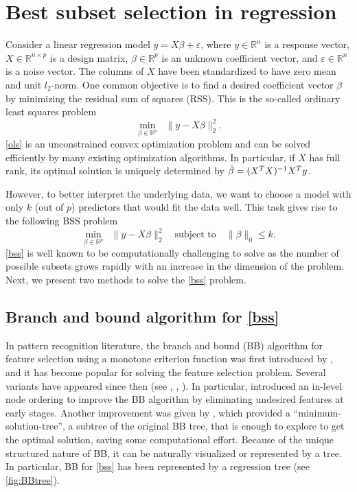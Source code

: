 \documentclass[10pt, letterpaper]{article}
\begin{document}
\section{Best subset selection in regression}\label{sec:intro-to-bss}
Consider a linear regression model \( y=X\beta+\varepsilon \),
where \(y \in \mathbb{R}^{n}\) is a response vector, \(X \in \mathbb{R}^{n \times p}\) is a design matrix, \(\beta \in \mathbb{R}^{p}\) is an unknown coefficient vector, and \(\varepsilon \in \mathbb{R}^{n}\) is a noise vector. The columns of $X$ have been standardized to have zero mean and unit $l_{2}$-norm. 
One common objective is to find a desired coefficient vector $\beta$ by minimizing the residual sum of squares (RSS). This is the so-called ordinary least squares problem
\begin{equation}\label{ols}
  \min_{\beta \in \mathbb{R}^{p} } \; \; \|y-X\beta\|_{2}^{2}. \tag{OLS}  
\end{equation}
\eqref{ols} is an unconstrained convex optimization problem and can be solved efficiently by many existing optimization algorithms. In particular, if $X$ has full rank, its optimal solution is uniquely determined by $\Hat{\beta}=(X^{T}X)^{-1}X^{T}y$.  

However, to better interpret the underlying data, we want to choose a model with only $k$ (out of $p$) predictors that would fit the data well. This task gives rise to the following BSS problem
\begin{equation}\label{bss}
    \min_{\beta \in \mathbb{R}^p} \; \; \|y-X\beta\|_{2}^{2} \quad \text{subject to} \quad \|\beta\|_{0} \leq k.  
    \tag{BSS}
\end{equation}
\eqref{bss} is well known to be computationally challenging to solve as the number of possible subsets grows rapidly with an increase in the dimension of the problem. Next, we present two methods to solve the \eqref{bss} problem.
\subsection{Branch and bound algorithm for \eqref{bss} } 
 In pattern recognition literature, the branch and bound (BB) algorithm for feature selection using a monotone criterion function was first introduced by \cite{narendra1977branch}, and it has become popular for solving the feature selection problem. Several variants have appeared since then (see \cite{fukunaga1990intro}, \cite{gatu:2006}, \cite{somol2004fast}). 
In particular, \cite{fukunaga1990intro} introduced an in-level node ordering to improve the BB algorithm by eliminating undesired features at early stages. Another improvement was given by \cite{yu1993more}, which provided a ``minimum-solution-tree'', a subtree of the original BB tree, that is enough to explore to get the optimal solution, saving some computational effort. Because of the unique structured nature of BB, it can be naturally visualized or represented by a tree. In particular, BB for \eqref{bss} has been represented by a regression tree (see \figurename{ \ref{fig:BBtree}}). 
\end{document}
